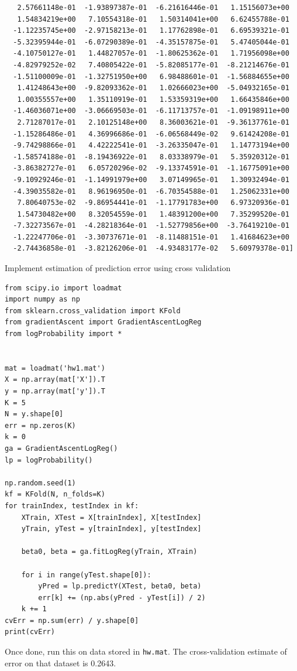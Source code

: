 \documentclass{article}
\begin{document}
\begin{lstlisting}
   2.57661148e-01  -1.93897387e-01  -6.21616446e-01   1.15156073e+00
   1.54834219e+00   7.10554318e-01   1.50314041e+00   6.62455788e-01
  -1.12235745e+00  -2.97158213e-01   1.17762898e-01   6.69539321e-01
  -5.32395944e-01  -6.07290389e-01  -4.35157875e-01   5.47405044e-01
  -4.10750127e-01   1.44827057e-01  -1.80625362e-01   1.71956098e+00
  -4.82979252e-02   7.40805422e-01  -5.82085177e-01  -8.21214676e-01
  -1.51100009e-01  -1.32751950e+00   6.98488601e-01  -1.56884655e+00
   1.41248643e+00  -9.82093362e-01   1.02666023e+00  -5.04932165e-01
   1.00355557e+00   1.35110919e-01   1.53359319e+00   1.66435846e+00
  -1.46036071e+00  -3.06669503e-01  -6.11713757e-01  -1.09198911e+00
   2.71287017e-01   2.10125148e+00   8.36003621e-01  -9.36137761e-01
  -1.15286486e-01   4.36996686e-01  -6.06568449e-02   9.61424208e-01
  -9.74298866e-01   4.42222541e-01  -3.26335047e-01   1.14773194e+00
  -1.58574188e-01  -8.19436922e-01   8.03338979e-01   5.35920312e-01
  -3.86382727e-01   6.05720296e-02  -9.13374591e-01  -1.16775091e+00
  -9.10929246e-01  -1.14991979e+00   3.07149965e-01   1.30932494e-01
  -4.39035582e-01   8.96196950e-01  -6.70354588e-01   1.25062331e+00
   7.80640753e-02  -9.86954441e-01  -1.17791783e+00   6.97320936e-01
   1.54730482e+00   8.32054559e-01   1.48391200e+00   7.35299520e-01
  -7.32273567e-01  -4.28218364e-01  -1.52779856e+00  -3.76419210e-01
  -1.22247706e-01  -3.30737671e-01  -8.11488151e-01   1.41684623e+00
  -2.74436858e-01  -3.82126206e-01  -4.93483177e-02   5.60979378e-01]
\end{lstlisting}
\newproblem{1pt}
Implement estimation of prediction error using cross validation
\begin{lstlisting}
from scipy.io import loadmat
import numpy as np
from sklearn.cross_validation import KFold
from gradientAscent import GradientAscentLogReg
from logProbability import *


mat = loadmat('hw1.mat')
X = np.array(mat['X']).T
y = np.array(mat['y']).T
K = 5
N = y.shape[0]
err = np.zeros(K)
k = 0
ga = GradientAscentLogReg()
lp = logProbability()

np.random.seed(1)
kf = KFold(N, n_folds=K)
for trainIndex, testIndex in kf:
	XTrain, XTest = X[trainIndex], X[testIndex]
	yTrain, yTest = y[trainIndex], y[testIndex]

	beta0, beta = ga.fitLogReg(yTrain, XTrain)

	for i in range(yTest.shape[0]):
		yPred = lp.predictY(XTest, beta0, beta)
		err[k] += (np.abs(yPred - yTest[i]) / 2)
	k += 1
cvErr = np.sum(err) / y.shape[0]
print(cvErr)
\end{lstlisting}
Once done, run this on data stored in \texttt{hw\theHW.mat}. The cross-validation estimate of error on that dataset is 0.2643.
\end{document}
